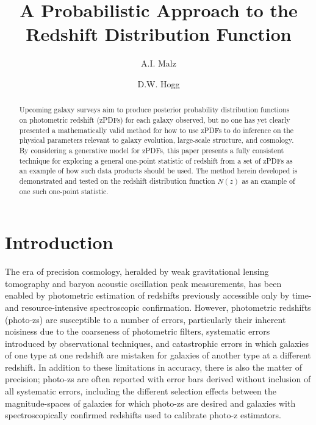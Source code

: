 \documentclass[preprint]{aastex}
\begin{document}
\title{A Probabilistic Approach to the Redshift Distribution Function}

\author{A.I. Malz}

\author{D.W. Hogg}

\begin{abstract}
Upcoming galaxy surveys aim to produce posterior probability distribution 
functions on photometric redshift (zPDFs) for each galaxy observed, but no one 
has yet clearly presented a mathematically valid method for how to use zPDFs to 
do inference on the physical parameters relevant to galaxy evolution, 
large-scale structure, and cosmology.  By considering a generative model for 
zPDFs, this paper presents a fully consistent technique for exploring a general 
one-point statistic of redshift from a set of zPDFs as an example of how such 
data products should be used.  The method herein developed is demonstrated and 
tested on the redshift distribution function $N(z)$ as an example of one such 
one-point statistic.
\end{abstract}


\clearpage
\section{Introduction}
\label{sec:intro}

The era of precision cosmology, heralded by weak gravitational lensing 
tomography and baryon acoustic oscillation peak measurements, has been enabled 
by photometric estimation of redshifts previously accessible only by time- and 
resource-intensive spectroscopic confirmation.  However, photometric redshifts 
(photo-zs) are susceptible to a number of errors, particularly their inherent 
noisiness due to the coarseness of photometric filters, systematic errors 
introduced by observational techniques, and catastrophic errors in which 
galaxies of one type at one redshift are mistaken for galaxies of another type 
at a different redshift.  In addition to these limitations in accuracy, there 
is also the matter of precision; photo-zs are often reported with error bars 
derived without inclusion of all systematic errors, including the different 
selection effects between the magnitude-spaces of galaxies for which photo-zs 
are desired and galaxies with spectroscopically confirmed redshifts used to 
calibrate photo-z estimators.
\end{document}
